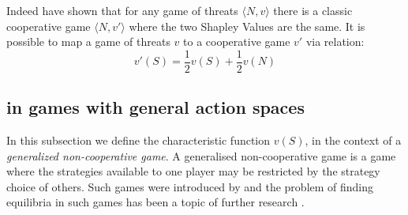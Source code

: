 Indeed \cite{KOHLBERG2018139} have shown that for any game of threats $\langle N,v\rangle$ there is a classic cooperative game $\langle N,v'\rangle$ where the two Shapley Values are the same.
It is possible to map a game of threats $v$ to a cooperative game $v'$ via relation:
\begin{equation}\label{convert1}
v'(S)=\frac{1}{2}v(S)+\frac{1}{2}v(N)
\end{equation}

\DIFaddbegin {}

\DIFaddend \subsection{\DIFdelbegin {}\DIFdelend \DIFaddbegin {}\DIFaddend in games with general action spaces}\label{the_value_def3}

In this subsection we define the characteristic function $v(S)$, in the context of a \textit{generalized non-cooperative game}.
A generalised non-cooperative game is a game where the strategies available to one player may be restricted by the strategy choice of others.
Such games were introduced by \cite{Debreu01101952} and the problem of finding equilibria in such games has been a topic of further research \citep{Facchinei2007,fischer2014}.

